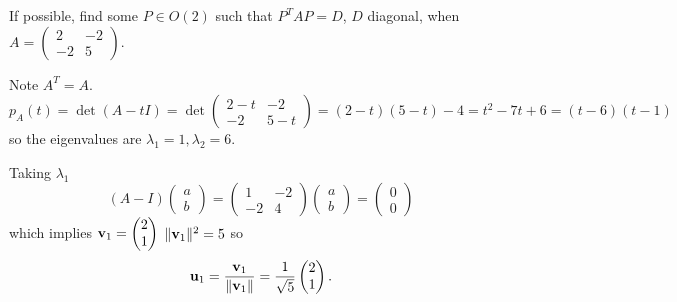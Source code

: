 \documentclass[10pt, a4paper]{article}
\begin{document}
\begin{example}
    If possible,
    find some $P \in O(2)$ such that
    $P ^ TAP = D$,
    $D$ diagonal,
    when $A = \begin{pmatrix}
        2 & -2 \\ -2 & 5
    \end{pmatrix}$.

    \begin{solution}
        Note $A ^ T = A$.
        \[
        p_A(t) = \det(A - tI) = \det\begin{pmatrix}
            2 - t & -2 \\
            -2 & 5 - t
        \end{pmatrix} = (2 - t)(5 - t) - 4 = t ^ 2 - 7t + 6 = (t - 6)(t - 1)
        \]
        so the eigenvalues are $\lambda_1 = 1, \lambda_2 = 6$.

        Taking $\lambda_1$
        \[
        (A - I)\begin{pmatrix}
            a \\ b
        \end{pmatrix} = \begin{pmatrix}
            1 & -2 \\ -2 & 4
        \end{pmatrix}\begin{pmatrix}
            a \\ b
        \end{pmatrix} = \begin{pmatrix}
            0  \\ 0
        \end{pmatrix}
        \]
        which implies $\mathbf{v}_1 = \begin{pmatrix}
            2 \\ 1
        \end{pmatrix}$
        $\|\mathbf{v}_1\| ^ 2 = 5$ so
        \[
        \mathbf{u}_1 = \frac{\mathbf{v}_1}{\|\mathbf{v}_1\|} = \frac{1}{\sqrt{5}}\begin{pmatrix}
            2 \\ 1
        \end{pmatrix}.
        \]


\end{solution}
\end{example}
\end{document}
